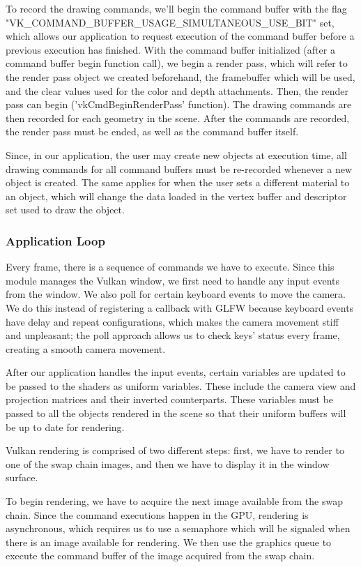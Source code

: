 To record the drawing commands, we'll begin the command buffer with the flag "VK\_COMMAND\_BUFFER\_USAGE\_SIMULTANEOUS\_USE\_BIT" set, which allows our application to request execution of the command buffer before a previous execution has finished. With the command buffer initialized (after a command buffer begin function call), we begin a render pass, which will refer to the render pass object we created beforehand, the framebuffer which will be used, and the clear values used for the color and depth attachments. Then, the render pass can begin ('vkCmdBeginRenderPass' function). The drawing commands are then recorded for each geometry in the scene. After the commands are recorded, the render pass must be ended, as well as the command buffer itself.

Since, in our application, the user may create new objects at execution time, all drawing commands for all command buffers must be re-recorded whenever a new object is created. The same applies for when the user sets a different material to an object, which will change the data loaded in the vertex buffer and descriptor set used to draw the object.

\subsubsection{Application Loop}
Every frame, there is a sequence of commands we have to execute. Since this module manages the Vulkan window, we first need to handle any input events from the window. We also poll for certain keyboard events to move the camera. We do this instead of registering a callback with GLFW because keyboard events have delay and repeat configurations, which makes the camera movement stiff and unpleasant; the poll approach allows us to check keys' status every frame, creating a smooth camera movement.

After our application handles the input events, certain variables are updated to be passed to the shaders as uniform variables. These include the camera view and projection matrices and their inverted counterparts. These variables must be passed to all the objects rendered in the scene so that their uniform buffers will be up to date for rendering.

Vulkan rendering is comprised of two different steps: first, we have to render to one of the swap chain images, and then we have to display it in the window surface.

To begin rendering, we have to acquire the next image available from the swap chain. Since the command executions happen in the GPU, rendering is asynchronous, which requires us to use a semaphore which will be signaled when there is an image available for rendering. We then use the graphics queue to execute the command buffer of the image acquired from the swap chain.

